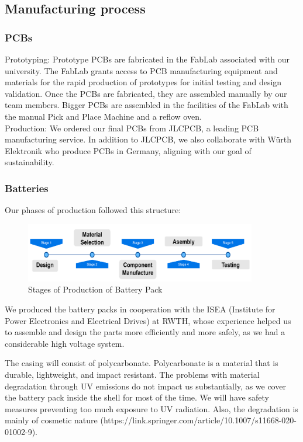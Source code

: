 \subsection{Manufacturing process}

\subsubsection{PCBs}
Prototyping: Prototype PCBs are fabricated in the FabLab associated with our university. The FabLab grants access to PCB manufacturing equipment and materials for the rapid production of prototypes for initial testing and design validation. Once the PCBs are fabricated, they are assembled manually by our team members. Bigger PCBs are assembled in the facilities of the FabLab with the manual Pick and Place Machine and a reflow oven. \\
Production: We ordered our final PCBs from JLCPCB, a leading PCB manufacturing service. In addition to JLCPCB, we also collaborate with Würth Elektronik who produce PCBs in Germany, aligning with our goal of sustainability.

\subsubsection{Batteries}
Our phases of production followed this structure:
\begin{figure}[H]
    \centering
    \includegraphics[width=0.9\textwidth]{texfiles/elec/eimg/BatteryProduction}
    \caption{Stages of Production of Battery Pack}
    \label{img: batteryproduction}
\end{figure}

We produced the battery packs in cooperation with the ISEA (Institute for Power Electronics and Electrical Drives) at RWTH, whose experience helped us to assemble and design the parts more efficiently and more safely, as we had a considerable high voltage system.

The casing will consist of polycarbonate. Polycarbonate is a material that is durable, lightweight, and impact resistant. The problems with material degradation through UV emissions do not impact us substantially, as we cover the battery pack inside the shell for most of the time. We will have safety measures preventing too much exposure to UV radiation. Also, the degradation is mainly of cosmetic nature (https://link.springer.com/article/10.1007/s11668-020-01002-9).


